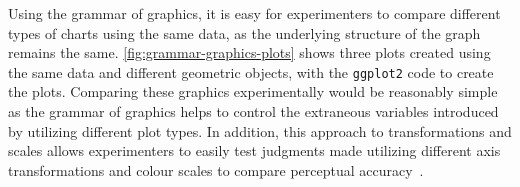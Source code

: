 \documentclass[letterpaper]{ar-1col}\usepackage[]{graphicx}\usepackage[]{color}
\begin{document}
Using the grammar of graphics, it is easy for experimenters to compare different types of charts using the same data, as the underlying structure of the graph remains the same. \autoref{fig:grammar-graphics-plots} shows three plots created using the same data and different geometric objects, with the \texttt{ggplot2} code to create the plots. Comparing these graphics experimentally would be reasonably simple as the grammar of graphics helps to control the extraneous variables introduced by utilizing different plot types. In addition, this approach to transformations and scales allows experimenters to easily test judgments made utilizing different axis transformations and colour scales to compare perceptual accuracy~\citep{hofmannGraphicalTestsPower2012,vanderplasClustersBeatTrend2017}.
\end{document}
